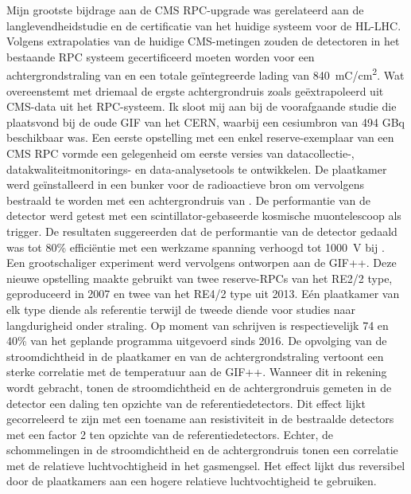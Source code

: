 	Mijn grootste bijdrage aan de CMS RPC-upgrade was gerelateerd aan de langlevendheidstudie en de certificatie van het huidige systeem voor de HL-LHC. Volgens extrapolaties van de huidige CMS-metingen zouden de detectoren in het bestaande RPC systeem gecertificeerd moeten worden voor een achtergrondstraling van  en een totale geïntegreerde lading van \SI{840}{mC/cm^2}. Wat overeenstemt met driemaal de ergste achtergrondruis zoals geëxtrapoleerd uit CMS-data uit het RPC-systeem. Ik sloot mij aan bij de voorafgaande studie die plaatsvond bij de oude GIF van het CERN, waarbij een cesiumbron van 494 GBq beschikbaar was. Een eerste opstelling met een enkel reserve-exemplaar van een CMS RPC vormde een gelegenheid om eerste versies van datacollectie-, datakwaliteitmonitorings- en data-analysetools te ontwikkelen. De plaatkamer werd geïnstalleerd in een bunker voor de radioactieve bron om vervolgens bestraald te worden met een achtergrondruis van . De performantie van de detector werd getest met een scintillator-gebaseerde kosmische muontelescoop als trigger. De resultaten suggereerden dat de performantie van de detector gedaald was tot 80\% efficiëntie met een werkzame spanning verhoogd tot \SI{1000}{V} bij .\\
	Een grootschaliger experiment werd vervolgens ontworpen aan de GIF++. Deze nieuwe opstelling maakte gebruikt van twee reserve-RPCs van het RE2/2 type, geproduceerd in 2007 en twee van het RE4/2 type uit 2013. Eén plaatkamer van elk type diende als referentie terwijl de tweede diende voor studies naar langdurigheid onder straling. Op moment van schrijven is respectievelijk 74 en 40\% van het geplande programma uitgevoerd sinds 2016. De opvolging van de stroomdichtheid in de plaatkamer en van de achtergrondstraling vertoont een sterke correlatie met de temperatuur aan de GIF++. Wanneer dit in rekening wordt gebracht, tonen de stroomdichtheid en de achtergrondruis gemeten in de detector een daling ten opzichte van de referentiedetectors. Dit effect lijkt gecorreleerd te zijn met een toename aan resistiviteit in de bestraalde detectors met een factor 2 ten opzichte van de referentiedetectors. Echter, de schommelingen in de stroomdichtheid en de achtergrondruis tonen een correlatie met de relatieve luchtvochtigheid in het gasmengsel. Het effect lijkt dus reversibel door de plaatkamers aan een hogere relatieve luchtvochtigheid te gebruiken.\\
